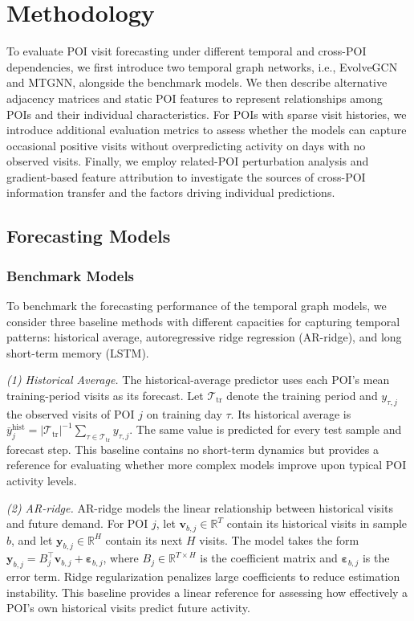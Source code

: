\documentclass[preprint,authoryear,11pt]{elsarticle}
\theoremstyle{definition}
\begin{document}
\section{Methodology}
\label{sec:methodology}

To evaluate POI visit forecasting under different temporal and cross-POI dependencies, we first introduce two temporal graph networks, i.e., EvolveGCN and MTGNN, alongside the benchmark models.
We then describe alternative adjacency matrices and static POI features to represent relationships among POIs and their individual characteristics.
For POIs with sparse visit histories, we introduce additional evaluation metrics to assess whether the models can capture occasional positive visits without overpredicting activity on days with no observed visits.
Finally, we employ related-POI perturbation analysis and gradient-based feature attribution to investigate the sources of cross-POI information transfer and the factors driving individual predictions.

\subsection{Forecasting Models}
\label{subsec:forecasting_models}
\subsubsection{Benchmark Models}
\label{subsubsec:benchmark_models}
To benchmark the forecasting performance of the temporal graph models, we consider three baseline methods with different capacities for capturing temporal patterns: historical average, autoregressive ridge regression (AR-ridge), and long short-term memory (LSTM).

\textit{(1) Historical Average.}
The historical-average predictor uses each POI's mean training-period visits as its forecast.
Let \(\mathcal{T}_{\mathrm{tr}}\) denote the training period and \(y_{\tau,j}\) the observed visits of POI \(j\) on training day \(\tau\).
Its historical average is \(\bar y_j^{\mathrm{hist}}=|\mathcal{T}_{\mathrm{tr}}|^{-1}\sum_{\tau\in\mathcal{T}_{\mathrm{tr}}}y_{\tau,j}\).
The same value is predicted for every test sample and forecast step.
This baseline contains no short-term dynamics but provides a reference for evaluating whether more complex models improve upon typical POI activity levels.

\textit{(2) AR-ridge.}
AR-ridge models the linear relationship between historical visits and future demand.
For POI \(j\), let \(\mathbf v_{b,j}\in\mathbb{R}^{T}\) contain its historical visits in sample \(b\), and let \(\mathbf y_{b,j}\in\mathbb{R}^{H}\) contain its next \(H\) visits.
The model takes the form
\(\mathbf y_{b,j}=B_j^\top\mathbf v_{b,j}+\boldsymbol{\varepsilon}_{b,j}\),
where \(B_j\in\mathbb{R}^{T\times H}\) is the coefficient matrix and \(\boldsymbol{\varepsilon}_{b,j}\) is the error term.
Ridge regularization penalizes large coefficients to reduce estimation instability.
This baseline provides a linear reference for assessing how effectively a POI's own historical visits predict future activity.
\end{document}
